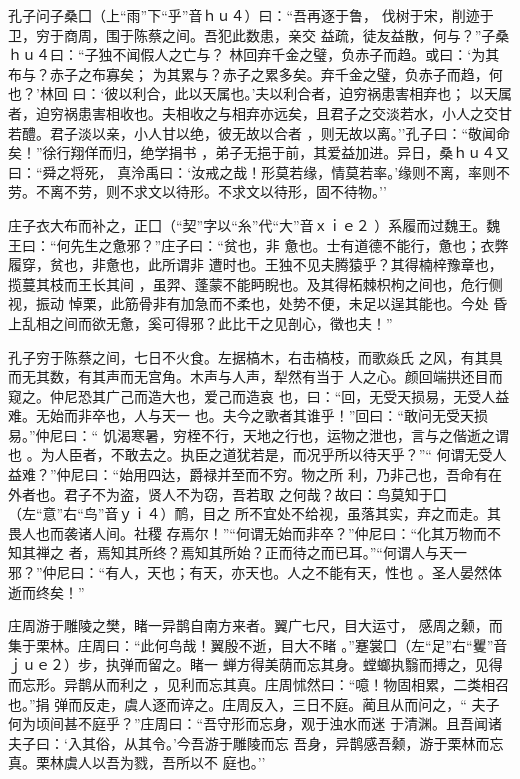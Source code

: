 \documentclass[]{article}
\begin{document}
孔子问子桑囗（上``雨''下``乎''音ｈｕ４）曰：``吾再逐于鲁，
伐树于宋，削迹于卫，穷于商周，围于陈蔡之间。吾犯此数患，亲交
益疏，徒友益散，何与？''子桑ｈｕ４曰：``子独不闻假人之亡与？
林回弃千金之璧，负赤子而趋。或曰：`为其布与？赤子之布寡矣；
为其累与？赤子之累多矣。弃千金之璧，负赤子而趋，何也？'林回
曰：`彼以利合，此以天属也。'夫以利合者，迫穷祸患害相弃也；
以天属者，迫穷祸患害相收也。夫相收之与相弃亦远矣，且君子之交淡若水，小人之交甘若醴。君子淡以亲，小人甘以绝，彼无故以合者
，则无故以离。''孔子曰：``敬闻命矣！''徐行翔佯而归，绝学捐书
，弟子无挹于前，其爱益加进。异日，桑ｈｕ４又曰：``舜之将死，
真泠禹曰：`汝戒之哉！形莫若缘，情莫若率。'缘则不离，率则不
劳。不离不劳，则不求文以待形。不求文以待形，固不待物。''

庄子衣大布而补之，正囗（``契''字以``糸''代``大''音ｘｉｅ２
）系履而过魏王。魏王曰：``何先生之惫邪？''庄子曰：``贫也，非
惫也。士有道德不能行，惫也；衣弊履穿，贫也，非惫也，此所谓非
遭时也。王独不见夫腾猿乎？其得楠梓豫章也，揽蔓其枝而王长其间
，虽羿、蓬蒙不能眄睨也。及其得柘棘枳枸之间也，危行侧视，振动
悼栗，此筋骨非有加急而不柔也，处势不便，未足以逞其能也。今处
昏上乱相之间而欲无惫，奚可得邪？此比干之见剖心，徵也夫！''

孔子穷于陈蔡之间，七日不火食。左据槁木，右击槁枝，而歌焱氏
之风，有其具而无其数，有其声而无宫角。木声与人声，犁然有当于
人之心。颜回端拱还目而窥之。仲尼恐其广己而造大也，爱己而造哀
也，曰：``回，无受天损易，无受人益难。无始而非卒也，人与天一
也。夫今之歌者其谁乎！''回曰：``敢问无受天损易。''仲尼曰：``
饥渴寒暑，穷桎不行，天地之行也，运物之泄也，言与之偕逝之谓也
。为人臣者，不敢去之。执臣之道犹若是，而况乎所以待天乎？''``
何谓无受人益难？''仲尼曰：``始用四达，爵禄并至而不穷。物之所
利，乃非己也，吾命有在外者也。君子不为盗，贤人不为窃，吾若取
之何哉？故曰：鸟莫知于囗（左``意''右``鸟''音ｙｉ４）鸸，目之
所不宜处不给视，虽落其实，弃之而走。其畏人也而袭诸人间。社稷
存焉尔！''``何谓无始而非卒？''仲尼曰：``化其万物而不知其禅之
者，焉知其所终？焉知其所始？正而待之而已耳。''``何谓人与天一
邪？''仲尼曰：``有人，天也；有天，亦天也。人之不能有天，性也
。圣人晏然体逝而终矣！''

庄周游于雕陵之樊，睹一异鹊自南方来者。翼广七尺，目大运寸，
感周之颡，而集于栗林。庄周曰：``此何鸟哉！翼殷不逝，目大不睹
。''蹇裳囗（左``足''右``矍''音ｊｕｅ２）步，执弹而留之。睹一
蝉方得美荫而忘其身。螳螂执翳而搏之，见得而忘形。异鹊从而利之
，见利而忘其真。庄周怵然曰：``噫！物固相累，二类相召也。''捐
弹而反走，虞人逐而谇之。庄周反入，三日不庭。蔺且从而问之，``
夫子何为顷间甚不庭乎？''庄周曰：``吾守形而忘身，观于浊水而迷
于清渊。且吾闻诸夫子曰：`入其俗，从其令。'今吾游于雕陵而忘
吾身，异鹊感吾颡，游于栗林而忘真。栗林虞人以吾为戮，吾所以不 庭也。''
\end{document}
